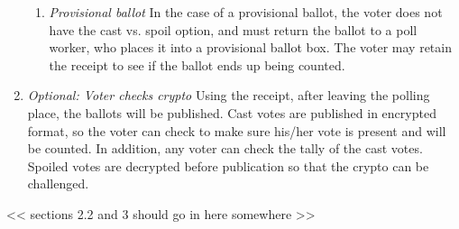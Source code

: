 \begin{enumerate}
\begin{enumerate}
\item {\em Provisional ballot}
In the case of a provisional ballot, the voter does not have the cast vs. spoil option, and must return the ballot to a poll worker, who places it into a provisional ballot box. The voter may retain the receipt to see if the ballot ends up being counted.
\end{enumerate}

\item {\em Optional: Voter checks crypto}
Using the receipt, after leaving the polling place, the ballots will be published. Cast votes are published in encrypted format, so the voter can check to make sure his/her vote is present and will be counted. In addition, any voter can check the tally of the cast votes. Spoiled votes are decrypted before publication so that the crypto can be challenged.
\end{enumerate}

<< sections 2.2 and 3 should go in here somewhere >>


